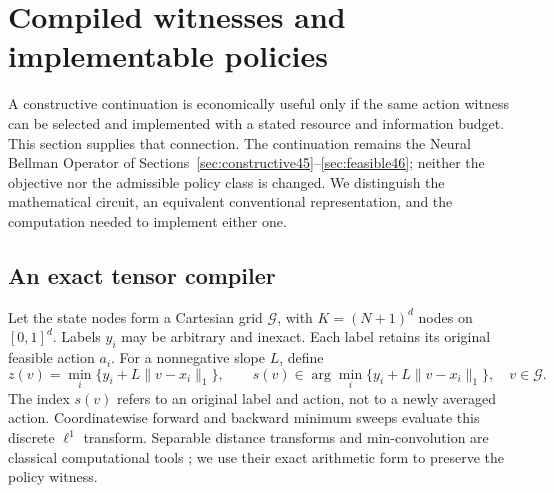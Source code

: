 \section{Compiled witnesses and implementable policies}\label{sec:operational47}
A constructive continuation is economically useful only if the same action witness can be selected and implemented with a stated resource and information budget. This section supplies that connection. The continuation remains the Neural Bellman Operator of Sections~\ref{sec:constructive45}--\ref{sec:feasible46}; neither the objective nor the admissible policy class is changed. We distinguish the mathematical circuit, an equivalent conventional representation, and the computation needed to implement either one.

\subsection{An exact tensor compiler}
Let the state nodes form a Cartesian grid $\mathcal G$, with $K=(N+1)^d$ nodes on $[0,1]^d$. Labels $y_i$ may be arbitrary and inexact. Each label retains its original feasible action $a_i$. For a nonnegative slope $L$, define
\begin{equation}\label{eq:closure47}
 z(v)=\min_i\{y_i+L\|v-x_i\|_1\},\qquad
 s(v)\in\arg\min_i\{y_i+L\|v-x_i\|_1\},\quad v\in\mathcal G.
\end{equation}
The index $s(v)$ refers to an original label and action, not to a newly averaged action. Coordinatewise forward and backward minimum sweeps evaluate this discrete $\ell^1$ transform. Separable distance transforms and min-convolution are classical computational tools \citep{felzenszwalb2012}; we use their exact arithmetic form to preserve the policy witness.

